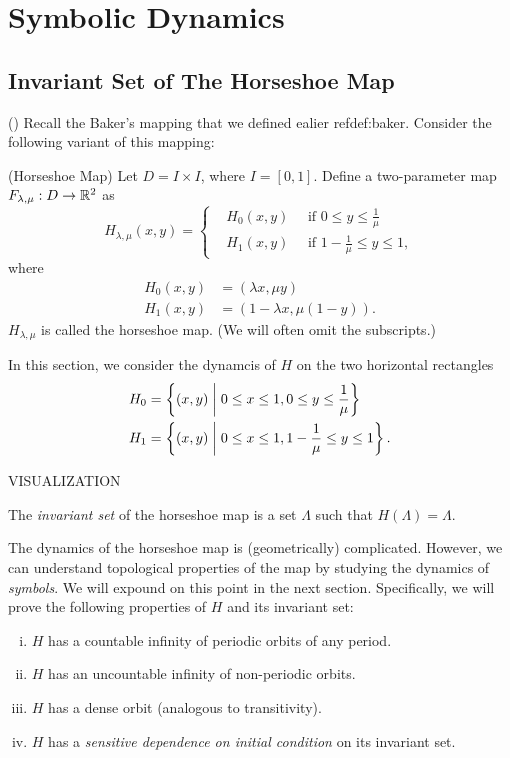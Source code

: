 \documentclass[12pt,twoside,draft]{book}
\begin{document}
\chapter{Symbolic Dynamics}
\section{Invariant Set of The Horseshoe Map}
(\citep{wiggins})
Recall the Baker's mapping that we defined ealier ref{def:baker}.
Consider the following variant of this mapping:
\begin{definition}
  (Horseshoe Map)
  Let $D = I \times I$, where $I = [0,1]$.
  Define a two-parameter map $F_{\lambda, \mu}: D \to \mathbb{R}^2$ as
  \begin{equation*}
    H_{\lambda, \mu}(x,y) =
    \begin{cases}
      &H_0(x,y) \quad\mbox{ if } 0 \leq y \leq \frac{1}{\mu}   \\
      &H_1(x,y) \quad\mbox{ if } 1 - \frac{1}{\mu} \leq y \leq 1,
    \end{cases}
  \end{equation*}
  where
  \begin{align*}
    H_0(x,y) &= (\lambda x, \mu y)  \\
    H_1(x,y) &= (1 - \lambda x, \mu(1 - y)).
  \end{align*}
  $H_{\lambda, \mu}$ is called the horseshoe map.
  (We will often omit the subscripts.)
\end{definition}
In this section, we consider the dynamcis of $H$ on the two horizontal rectangles 
\begin{align*}
  H_0 &= \left \{ (x,y) \mathrel{} \middle| \mathrel{}  0 \leq x \leq 1, 0 \leq y \leq \frac{1}{\mu} \right \}  \\
  H_1 &= \left \{ (x,y) \mathrel{} \middle| \mathrel{}  0 \leq x \leq 1, 1 - \frac{1}{\mu} \leq y \leq 1 \right \}.
\end{align*}

VISUALIZATION

The \textit{invariant set} of the horseshoe map is a set $\Lambda$ such that $H(\Lambda) = \Lambda$.

The dynamics of the horseshoe map is (geometrically) complicated.
However, we can understand topological properties of the map by studying the dynamics of \textit{symbols}.
We will expound on this point in the next section.
Specifically, we will prove the following properties of $H$ and its invariant set:
\begin{enumerate}[(i)]
  \item $H$ has a countable infinity of periodic orbits of any period.
  \item $H$ has an uncountable infinity of non-periodic orbits.
  \item $H$ has a dense orbit (analogous to transitivity).
  \item $H$ has a \textit{sensitive dependence on initial condition} on its invariant set.
\end{enumerate}
\end{document}
